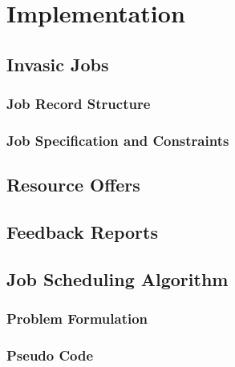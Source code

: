 \chapter{Implementation}\label{chapter:implementation}
\section{Invasic Jobs}
\subsection{Job Record Structure}
\subsection{Job Specification and Constraints}
\section{Resource Offers}
\section{Feedback Reports}
\section{Job Scheduling Algorithm}
\subsection{Problem Formulation}
\subsection{Pseudo Code}

